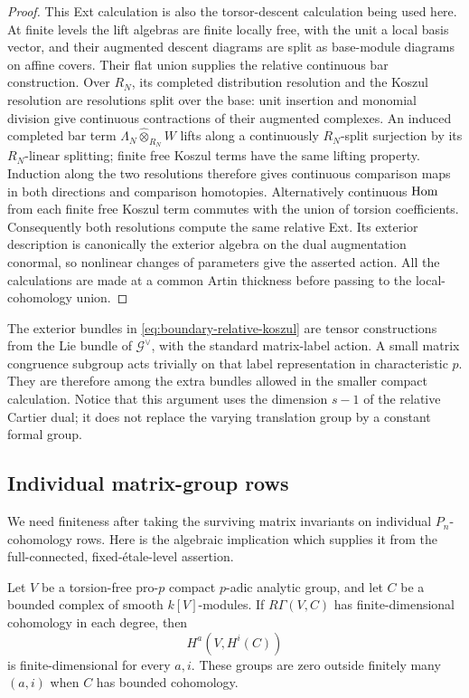 \begin{proof}
This Ext calculation is also the torsor-descent calculation being
used here.  At finite levels the lift algebras are finite locally
free, with the unit a local basis vector, and their augmented
descent diagrams are split as base-module diagrams on affine
covers.  Their flat union supplies the relative continuous bar
construction.  Over $R_N$, its completed distribution resolution
and the Koszul resolution are resolutions split over the base:
unit insertion and monomial division give continuous contractions
of their augmented complexes.  An induced completed bar term
$\Lambda_N\mathbin{\widehat\otimes}_{R_N}W$ lifts along a
continuously $R_N$-split surjection by its $R_N$-linear splitting;
finite free Koszul terms have the same lifting property.  Induction
along the two resolutions therefore gives continuous comparison
maps in both directions and comparison homotopies.
Alternatively continuous $\operatorname{Hom}$ from each finite free Koszul term
commutes with the union of torsion coefficients.  Consequently
both resolutions compute the same relative Ext.  Its exterior
description is canonically the exterior algebra on the dual
augmentation conormal, so nonlinear changes of parameters give
the asserted action.  All the calculations are made at a common
Artin thickness before passing to the local-cohomology union.
\end{proof}

The exterior bundles in \eqref{eq:boundary-relative-koszul} are
tensor constructions from the Lie bundle of $\mathcal G^\vee$, with
the standard matrix-label action.  A small matrix congruence
subgroup acts trivially on that label representation in
characteristic $p$.  They are therefore among the extra bundles
allowed in the smaller compact calculation.  Notice that this
argument uses the dimension $s-1$ of the relative Cartier dual;
it does not replace the varying translation group by a constant
formal group.

\subsection{Individual matrix-group rows}

We need finiteness after taking the surviving matrix invariants on
individual $P_n$-cohomology rows.  Here is the algebraic implication
which supplies it from the full-connected, fixed-\'etale-level
assertion.

\begin{lemma}
\label{boundary:row-finiteness}
Let $V$ be a torsion-free pro-$p$ compact $p$-adic analytic group,
and let $C$ be a bounded complex of smooth $k[V]$-modules.  If
$R\Gamma(V,C)$ has finite-dimensional cohomology in each degree,
then
\[
 H^a(V,H^i(C))
\]
is finite-dimensional for every $a,i$.  These groups are zero
outside finitely many $(a,i)$ when $C$ has bounded cohomology.
\end{lemma}

